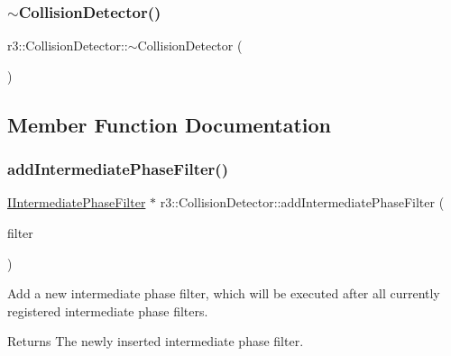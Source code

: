 \mbox{\label{classr3_1_1_collision_detector_ab45ac57f6ab9bcab367e104e9423722a}} 
\subsubsection{\texorpdfstring{$\sim$\+Collision\+Detector()}{~CollisionDetector()}}
{\footnotesize\ttfamily r3\+::\+Collision\+Detector\+::$\sim$\+Collision\+Detector (\begin{DoxyParamCaption}{ }\end{DoxyParamCaption})\hspace{0.3cm}{\ttfamily [default]}}



\subsection{Member Function Documentation}
\mbox{\label{classr3_1_1_collision_detector_a804d66d43502a2b113aa1e8c302cebc7}} 
\subsubsection{\texorpdfstring{add\+Intermediate\+Phase\+Filter()}{addIntermediatePhaseFilter()}}
{\footnotesize\ttfamily \mbox{\hyperlink{classr3_1_1_i_intermediate_phase_filter}{I\+Intermediate\+Phase\+Filter}} $\ast$ r3\+::\+Collision\+Detector\+::add\+Intermediate\+Phase\+Filter (\begin{DoxyParamCaption}\item[{\mbox{\hyperlink{classr3_1_1_collision_detector_a8337c2c23ec77350b65977e043c07827}{Intermediate\+Phase\+Filter\+\_\+\+Ptr}}}]{filter }\end{DoxyParamCaption})}

Add a new intermediate phase filter, which will be executed after all currently registered intermediate phase filters. \begin{DoxyReturn}{Returns}
The newly inserted intermediate phase filter. 
\end{DoxyReturn}
\mbox{\label{classr3_1_1_collision_detector_a58a1bd9705f241e4c137458bed35f596}} 

